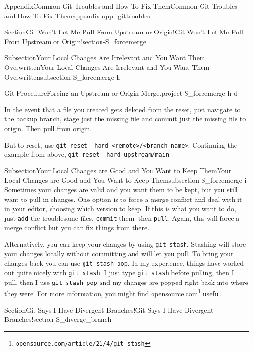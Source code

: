 \documentclass[oneside,10pt,]{book}
\newcommand{\mono}[1]{\texttt{#1}}
\begin{document}
\begin{appendixptx}{Appendix}{Common Git Troubles and How To Fix Them}{}{Common Git Troubles and How To Fix Them}{}{}{appendix-app_gittroubles}
\begin{sectionptx}{Section}{Git Won't Let Me Pull From Upstream or Origin!}{}{Git Won't Let Me Pull From Upstream or Origin!}{}{}{section-S_forcemerge}
\begin{subsectionptx}{Subsection}{Your Local Changes Are Irrelevant and You Want Them Overwritten}{}{Your Local Changes Are Irrelevant and You Want Them Overwritten}{}{}{subsection-S_forcemerge-h}
\begin{project}{Git Procedure}{Forcing an Upstream or Origin Merge.}{project-S_forcemerge-h-d}
\begin{enumerate}[font=\bfseries,label=(\alph*),ref=\alph*]
\par
In the event that a file you created gets deleted from the reset, just navigate to the backup branch, stage just the missing file and commit just the missing file to origin. Then pull from origin.%
\par
But to reset, use \mono{git reset --hard <remote>/<branch-name>}. Continuing the example from above, \mono{git reset --hard upstream/main}%
\end{enumerate}%
\end{project}%
\end{subsectionptx}
%
%
\typeout{************************************************}
\typeout{************************************************}
%
\begin{subsectionptx}{Subsection}{Your Local Changes are Good and You Want to Keep Them}{}{Your Local Changes are Good and You Want to Keep Them}{}{}{subsection-S_forcemerge-i}
%
%
Sometimes your changes are valid and you want them to be kept, but you still want to pull in changes. One option is to force a merge conflict and deal with it in your editor, choosing which version to keep. If this is what you want to do, just \mono{add} the troublesome files, \mono{commit} them, then \mono{pull}. Again, this will force a merge conflict but you can fix things from there.%
\par
Alternatively, you can keep your changes by using \mono{git stash}. Stashing will store your changes locally without committing and will let you pull. To bring your changes back you can use \mono{git stash pop}. In my experience, things have worked out quite nicely with \mono{git stash}. I just type \mono{git stash} before pulling, then I pull, then I use \mono{git stash pop} and my changes are popped right back into where they were. For more information, you might find \href{https://opensource.com/article/21/4/git-stash}{opensource.com}\footnote{\nolinkurl{opensource.com/article/21/4/git-stash}\label{fn-S_forcemerge-i-e-g}} useful.%
\end{subsectionptx}
\end{sectionptx}
%
%
\typeout{************************************************}
\typeout{************************************************}
%
\begin{sectionptx}{Section}{Git Says I Have Divergent Branches!}{}{Git Says I Have Divergent Branches!}{}{}{section-S_diverge_branch}

\end{sectionptx}
\end{appendixptx}
\end{document}
